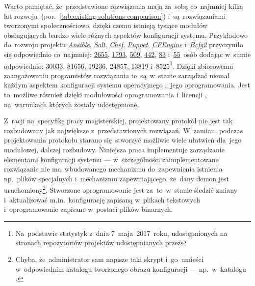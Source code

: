 \documentclass[thesis]{subfiles}
\begin{document}
Warto pamiętać, że~przedstawione rozwiązania mają za~sobą co~najmniej kilka lat rozwoju~(por.~\ref{tab:existing-solutions-comparison}) i~są~rozwiązaniami tworzonymi społecznościowo, dzięki czemu istnieją tysiące modułów obsługujących bardzo wiele różnych aspektów konfiguracji systemu. Przykładowo do~rozwoju projektu \emph{\hyperref[sec:ansible]{Ansible}}, \emph{\hyperref[sec:salt]{Salt}}, \emph{\hyperref[sec:chef]{Chef}}, \emph{\hyperref[sec:puppet]{Puppet}}, \emph{\hyperref[itm:cfengine]{CFEngine}} i~\emph{\hyperref[itm:bcfg2]{Bcfg2}} przyczyniło się odpowiednio co~najmniej: \href{https://github.com/ansible/ansible}{2655}, \href{https://github.com/saltstack/salt}{1793}, \href{https://github.com/chef/chef}{509}, \href{https://github.com/puppetlabs/puppet}{442}, \href{https://github.com/cfengine/core}{83} i~\href{https://github.com/Bcfg2/bcfg2}{55}~osób dodając w~sumie odpowiednio: \href{https://github.com/ansible/ansible}{30033}, \href{https://github.com/saltstack/salt}{81656}, \href{https://github.com/chef/chef}{19236}, \href{https://github.com/puppetlabs/puppet}{24857}, \href{https://github.com/cfengine/core}{13819} i~\href{https://github.com/Bcfg2/bcfg2}{8525}\footnote{Na~podstawie statystyk z~dnia 7~maja~2017~roku, udostępnionych na stronach repozytoriów projektów udostępnianych przez }. Dzięki zbiorowemu zaangażowaniu programistów rozwiązania te~są~w~stanie zarządzać niemal każdym aspektem konfiguracji systemu operacyjnego i~jego oprogramowania. Jest to~możliwe również dzięki modułowości oprogramowania i~licencji , na~warunkach których zostały udostępnione.

Z~racji na~specyfikę pracy magisterskiej, projektowany protokół nie jest tak rozbudowany jak największe z~przedstawionych rozwiązań. W~zamian, podczas projektowania protokołu starano się~stworzyć możliwie wiele ułatwień dla~jego modułowej, dalszej rozbudowy. Niniejsza praca implementuje zarządzanie elementami konfiguracji systemu --- w~szczególności zaimplementowane rozwiązanie nie ma~wbudowanego mechanizmu do~zapewnienia istnienia np.~plików specjalnych i~mechanizmu zapewniającego, że~dany \gls{demon} jest uruchomiony\footnote{Chyba, że~administrator sam napisze taki skrypt i~go~umieści w~odpowiednim katalogu tworzonego obrazu konfiguracji --- np.~w~katalogu .}. Stworzone oprogramowanie jest za~to~w~stanie śledzić zmiany i~aktualizować m.in.~konfigurację zapisaną w~plikach tekstowych i~oprogramowanie zapisane w~postaci plików binarnych.
\end{document}
